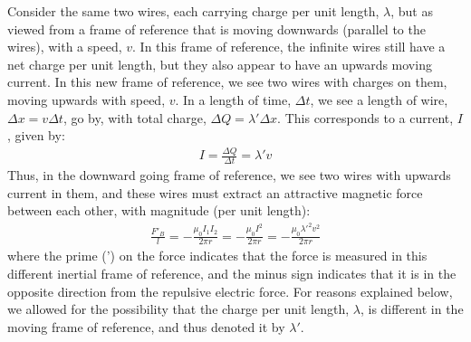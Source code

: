 Consider the same two wires, each carrying charge per unit length, $\lambda$, but as viewed from a frame of reference that is moving downwards (parallel to the wires), with a speed, $v$. In this frame of reference, the infinite wires still have a net charge per unit length, but they also appear to have an upwards moving current.
In this new frame of reference, we see two wires with charges on them, moving upwards with speed, $v$. In a length of time, $\Delta t$, we see a length of wire, $\Delta x=v\Delta t$, go by, with total charge, $\Delta Q=\lambda' \Delta x$. This corresponds to a current, $I$, given by:
\begin{align*}
I=\frac{\Delta Q}{\Delta t}=\lambda' v
\end{align*} 
Thus, in the downward going frame of reference, we see two wires with upwards current in them, and these wires must extract an attractive magnetic force between each other, with magnitude (per unit length):
\begin{align*}
\frac{F'_B}{l} = -\frac{\mu_0 I_1I_2}{2\pi r}=-\frac{\mu_0 I^2}{2\pi r}=-\frac{\mu_0 \lambda'^2 v^2}{2\pi r}
\end{align*}
where the prime (') on the force indicates that the force is measured in this different inertial frame of reference, and the minus sign indicates that it is in the opposite direction from the repulsive electric force. For reasons explained below, we allowed for the possibility that the charge per unit length, $\lambda$, is different in the moving frame of reference, and thus denoted it by $\lambda'$.

